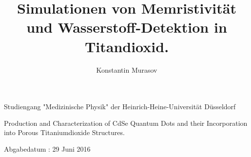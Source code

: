 \documentclass[12pt]{article}
\author{Konstantin Murasov}
\title{Simulationen von Memristivität und Wasserstoff-Detektion in Titandioxid.}
\begin{document}
\begin{center}

Studiengang "Medizinische Physik" der Heinrich-Heine-Universität Düsseldorf\\

\vspace{5cm}

\large Production and Characterization of CdSe Quantum Dots and their Incorporation into Porous Titaniumdioxide Structures.\\

\vspace{5cm}



\end{center}
\begin{figure*}[b]
Abgabedatum : 29 Juni 2016\\
\end{figure*}

%
	\newpage
	\tableofcontents
	\newpage

\end{document}
